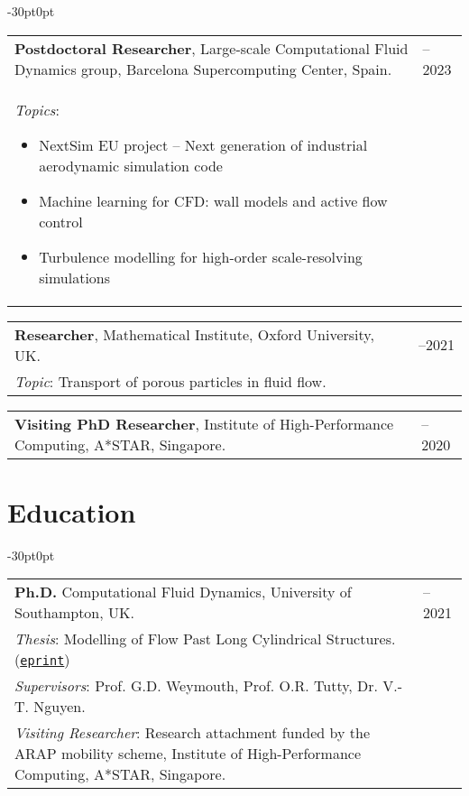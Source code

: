 \documentclass[line]{res}
\newenvironment{p1}
{\begin{adjustwidth}{-30pt}{0pt}
\vspace{8pt}}
{\end{adjustwidth}}
\begin{document}
\begin{resume}
\begin{p1}
\vspace{5pt}
\begin{tabular}{p{} >{\raggedleft\arraybackslash}p{}}
	\textbf{Postdoctoral Researcher}, Large-scale Computational Fluid Dynamics group, Barcelona Supercomputing Center, Spain. & 2021--2023 \\
	\textit{Topics}:
	\begin{itemize}
		\item NextSim EU project -- Next generation of industrial aerodynamic simulation code
		\item Machine learning for CFD: wall models and active flow control
		\item Turbulence modelling for high-order scale-resolving simulations
	\end{itemize}
\end{tabular}

\vspace{5pt}
\begin{tabular}{p{} >{\raggedleft\arraybackslash}p{}}
	\textbf{Researcher}, Mathematical Institute, Oxford University, UK.& 2020--2021 \\
\textit{Topic}: Transport of porous particles in fluid flow. & \\
\end{tabular}

\vspace{5pt}
\begin{tabular}{p{} >{\raggedleft\arraybackslash}p{}}
	\textbf{Visiting PhD Researcher}, Institute of High-Performance Computing, A*STAR, Singapore. & 2017--2020 \\
\end{tabular}
\end{p1}

\section{Education}

\begin{p1}
\begin{tabular}{p{} >{\raggedleft\arraybackslash}p{}}
	\textbf{Ph.D.} Computational Fluid Dynamics, University of Southampton, UK. & 2015--2021 \\
	\textit{Thesis}: Modelling of Flow Past Long Cylindrical Structures. (\href{https://b-fg.github.io/assets/pdf/Font_2020_PhD_Modelling_of_Flow_Past_Long_Cylindrical_Structures.pdf}{\texttt{eprint}}) & \\
	\textit{Supervisors}: Prof. G.D. Weymouth, Prof. O.R. Tutty, Dr. V.-T. Nguyen. & \\
	\textit{Visiting Researcher}: Research attachment funded by the ARAP mobility scheme, Institute of High-Performance Computing, A*STAR, Singapore. & \\
\end{tabular}


\end{p1}
\end{resume}
\end{document}
